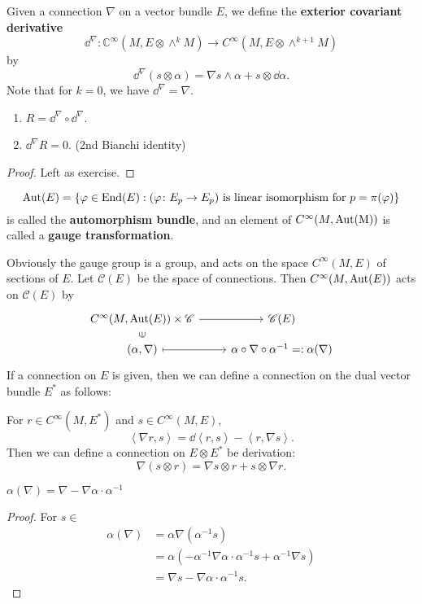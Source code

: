 \documentclass[12pt]{article}
\begin{document}
\begin{definition}
    Given a connection \(\nabla\) on a vector bundle \(E\), we define the
    \textbf{exterior covariant derivative} \[
        \dd^\nabla\colon \mathbb{C}^\infty(M,E\otimes \wedge^k M)
        \longrightarrow C^\infty(M,E\otimes \wedge^{k+1}M)
    \] by \[
        \dd^\nabla (s\otimes \alpha)=\nabla s\wedge \alpha+s\otimes \dd{\alpha}
    .\] Note that for \(k=0\), we have \(\dd^\nabla =\nabla\).
\end{definition}
\begin{prop}\hfill
\begin{enumerate}[(1)]
\item \(R=\dd^\nabla\circ \dd^\nabla\).
\item \(\dd^\nabla R=0\). (2nd Bianchi identity)
\end{enumerate}
\end{prop}
\begin{proof}
    Left as exercise.
\end{proof}

\begin{definition}
    \[
        \operatorname{Aut}(E)=\{\varphi\in \operatorname{End}(E):(\varphi\colon E_p\to E_p)
        \text{ is linear isomorphism for }p=\pi(\varphi)\}
    \] is called the \textbf{automorphism bundle}, and an element of
    \(C^\infty(M,\operatorname{Aut(M)})\) is called a \textbf{gauge transformation}.
\end{definition}
Obviously the gauge group is a group, and acts on the space \(C^\infty(M,E)\) of 
sections of \(E\). Let \(\mathscr{C}(E)\) be the space of connections. Then
\(C^\infty(M,\operatorname{Aut}(E))\) acts on \(\mathscr{C}(E)\) by 
\[\begin{tikzcd}[row sep=small]
	{C^\infty(M,\op{Aut}(E))\times \mathscr{C}} & {\mathscr{C}(E)} \\
	{(\alpha,\nabla)} & {\alpha\circ\nabla\circ\alpha^{-1}=:\alpha(\nabla)}
	\arrow[maps to, from=2-1, to=2-2]
	\arrow[from=1-1, to=1-2]
	\arrow["\in"{marking}, draw=none, from=2-1, to=1-1]
\end{tikzcd}\]
If a connection on \(E\) is given, then we can define a connection on the dual vector
bundle \(E^*\) as follows:

For \(r\in C^\infty(M,E^*)\) and \(s\in C^\infty(M,E)\), \[
    \left<\nabla r,s\right> =\dd{\left<r,s\right>}-\left<r,\nabla s\right> 
.\] Then we can define a connection on \(E\otimes E^*\) be derivation: \[
    \nabla (s\otimes r)=\nabla s\otimes r+s\otimes \nabla r
.\] 

\begin{prop}
    \(\alpha(\nabla)=\nabla -\nabla\alpha\cdot \alpha^{-1}\)
\end{prop}
\begin{proof}
    For \(s\in \)
\begin{align*}
    \alpha(\nabla)&=\alpha \nabla(\alpha^{-1}s) \\
    &=\alpha(-\alpha^{-1}\nabla\alpha\cdot\alpha^{-1}s+\alpha^{-1}\nabla s) \\
    &=\nabla s-\nabla\alpha\cdot \alpha^{-1}s
.\end{align*}
\end{proof}
\end{document}
